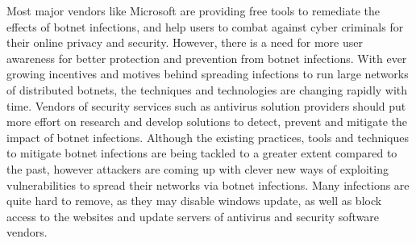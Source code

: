 Most major vendors like Microsoft are providing free tools to remediate the effects of botnet infections, and help users to combat against cyber criminals for their online privacy and security. However, there is a need for more user awareness for better protection and prevention from botnet infections. With ever growing incentives and motives behind spreading infections to run large networks of distributed botnets, the techniques and technologies are changing rapidly with time. Vendors of security services such as antivirus solution providers should put more effort on research and develop solutions to detect, prevent and mitigate the impact of botnet infections. Although the existing practices, tools and techniques to mitigate botnet infections are being tackled to a greater extent compared to the past, however attackers are coming up with clever new ways of exploiting vulnerabilities to spread their networks via botnet infections. Many infections are quite hard to remove, as they may disable windows update, as well as block access to the websites and update servers of antivirus and security software vendors. 
